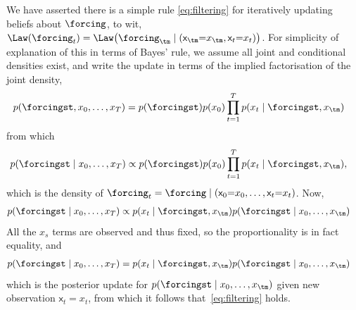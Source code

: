 \documentclass{article}
\newcommand{\rv}[1]{\mathsf{#1}}
\newcommand{\gvn}{\mid}
\newcommand{\state}{\rv{x}}
\newcommand{\statest}{x}
\begin{document}
We have asserted there is a simple rule \eqref{eq:filtering} for iteratively updating beliefs about \(\forcing\), to wit,
\(\Law(\forcing_{t}) = \Law\big(\forcing_{\tm} \gvn (\state_{\tm}{=}\statest_{\tm}, \state_{t}{=}\statest_{t})\big)\).
For simplicity of explanation of this in terms of Bayes' rule, we assume all joint and conditional densities exist, and write the update in terms of the implied factorisation of the joint density,
\begin{align*}
    p(\forcingst, \statest_{0},\dots,\statest_{T})
    &=p(\forcingst)p(\statest_{0})\prod_{t=1}^{T}p(\statest_{t}\gvn \forcingst, \statest_{\tm})
\end{align*}
from which
\begin{align*}
    p(\forcingst\gvn \statest_{0},\dots,\statest_{T})
    &\propto p(\forcingst)p(\statest_{0})\prod_{t=1}^{T}p(\statest_{t}\gvn \forcingst, \statest_{\tm}),
\end{align*}
which is the density of \(\forcing_{t}=\forcing\gvn (\state_{0}{=}\statest_{0},\dots,\state_{t}{=}\statest_{t})\). Now,
\begin{align*}
    p(\forcingst\gvn \statest_{0},\dots,\statest_{T})
    &\propto p(\statest_{t}\gvn \forcingst, \statest_{\tm})p(\forcingst \gvn \statest_{0},\dots, \statest_{\tm})
\end{align*}
All the \(\statest_{s}\) terms are observed and thus fixed, so the proportionality is in fact equality, and
\begin{align*}
    p(\forcingst\gvn \statest_{0},\dots,\statest_{T})
    &= p(\statest_{t}\gvn \forcingst, \statest_{\tm})p(\forcingst \gvn \statest_{0},\dots, \statest_{\tm})
\end{align*}
which is the posterior update for \(p(\forcingst \gvn \statest_{0},\dots, \statest_{\tm})\) given new observation \(\state_{t}{=}\statest_{t}\),
from which it follows that~\eqref{eq:filtering} holds.
\end{document}
